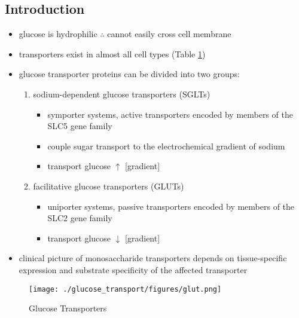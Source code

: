 \documentclass{scrartcl}
\begin{document}
\subsection{Introduction}
\label{sec:org9123b8e}
\begin{itemize}
\item glucose is hydrophilic \(\therefore\) cannot easily cross cell membrane
\item transporters exist in almost all cell types (Table \ref{fig:org286f992})
\item glucose transporter proteins can be divided into two groups:
\begin{enumerate}
\item sodium-dependent glucose transporters (SGLTs)
\begin{itemize}
\item symporter systems, active transporters encoded by members of
the SLC5 gene family
\item couple sugar transport to the electrochemical gradient of sodium
\item transport glucose \(\uparrow\) [gradient]
\end{itemize}
\item facilitative glucose transporters (GLUTs)
\begin{itemize}
\item uniporter systems, passive transporters encoded by members of the SLC2 gene family
\item transport glucose \(\downarrow\) [gradient]
\end{itemize}
\end{enumerate}
\item clinical picture of monosaccharide transporters depends on tissue-specific expression and
substrate specificity of the affected transporter
\end{itemize}

\begin{figure}[htbp]
\centering
\texttt{[image: ./glucose\_transport/figures/glut.png]}
\caption[glucose transporters]{\label{fig:org286f992}
Glucose Transporters}
\end{figure}
\end{document}
